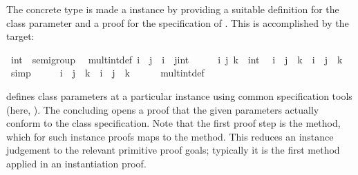 \begin{isabellebody}
\begin{isamarkuptext}
\end{isamarkuptext}%
\isamarkuptrue%
%
\isamarkuptrue%
%
\begin{isamarkuptext}%
The concrete type  is made a  instance
  by providing a suitable definition for the class parameter \isa{{\isacharparenleft}{\isasymotimes}{\isacharparenright}} and a proof for the specification of \hyperlink{fact.assoc}{\mbox{}}.  This is
  accomplished by the \hyperlink{command.instantiation}{\mbox{}} target:%
\end{isamarkuptext}%
\isamarkuptrue%
%
\isadelimquote
%
\endisadelimquote
%
\isatagquote
{}\isamarkupfalse%
\ int\ {\isacharcolon}{\isacharcolon}\ semigroup\isanewline
{}\isanewline
\isanewline
{}\isamarkupfalse%
\isanewline
\ \ mult{\isacharunderscore}int{\isacharunderscore}def{\isacharcolon}\ {\isachardoublequoteopen}i\ {\isasymotimes}\ j\ {\isacharequal}\ i\ {\isacharplus}\ {\isacharparenleft}j{\isasymColon}int{\isacharparenright}{\isachardoublequoteclose}\isanewline
\isanewline
{}\isamarkupfalse%
\ \isamarkupfalse%
\isanewline
\ \ \isamarkupfalse%
\ i\ j\ k\ {\isacharcolon}{\isacharcolon}\ int\ \isamarkupfalse%
\ {\isachardoublequoteopen}{\isacharparenleft}i\ {\isacharplus}\ j{\isacharparenright}\ {\isacharplus}\ k\ {\isacharequal}\ i\ {\isacharplus}\ {\isacharparenleft}j\ {\isacharplus}\ k{\isacharparenright}{\isachardoublequoteclose}\ \isamarkupfalse%
\ simp\isanewline
\ \ \isamarkupfalse%
\ \isamarkupfalse%
\ {\isachardoublequoteopen}{\isacharparenleft}i\ {\isasymotimes}\ j{\isacharparenright}\ {\isasymotimes}\ k\ {\isacharequal}\ i\ {\isasymotimes}\ {\isacharparenleft}j\ {\isasymotimes}\ k{\isacharparenright}{\isachardoublequoteclose}\isanewline
\ \ \ \ \isamarkupfalse%
\ mult{\isacharunderscore}int{\isacharunderscore}def\ \isacommand{{\isachardot}}\isamarkupfalse%
\isanewline
{}\isamarkupfalse%
\isanewline
\isanewline
{}\isamarkupfalse%
%
\endisatagquote
{\isafoldquote}%
%
\isadelimquote
%
\endisadelimquote
%
\begin{isamarkuptext}%
\noindent \hyperlink{command.instantiation}{\mbox{}} defines class parameters at a
  particular instance using common specification tools (here,
  \hyperlink{command.definition}{\mbox{}}).  The concluding \hyperlink{command.instance}{\mbox{}} opens a
  proof that the given parameters actually conform to the class
  specification.  Note that the first proof step is the \hyperlink{method.default}{\mbox{}} method, which for such instance proofs maps to the \hyperlink{method.intro-classes}{\mbox{}} method.  This reduces an instance judgement to the
  relevant primitive proof goals; typically it is the first method
  applied in an instantiation proof.


\end{isamarkuptext}
\end{isabellebody}
